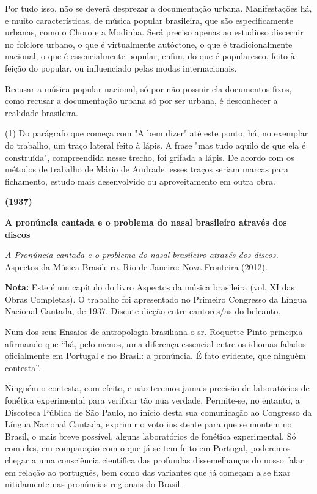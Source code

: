 Por tudo isso, não se deverá desprezar a documentação urbana.
Manifestações há, e muito características, de música popular brasileira,
que são especificamente urbanas, como o Choro e a Modinha. Será preciso
apenas ao estudioso discernir no folclore urbano, o que é virtualmente
autóctone, o que é tradicionalmente nacional, o que é essencialmente
popular, enfim, do que é popularesco, feito à feição do popular, ou
influenciado pelas modas internacionais.

Recusar a música popular nacional, só por não possuir ela documentos
fixos, como recusar a documentação urbana só por ser urbana, é
desconhecer a realidade brasileira.

(1) Do parágrafo que começa com "A bem dizer" até este ponto, há, no
exemplar do trabalho, um traço lateral feito à lápis. A frase "mas tudo
aquilo de que ela é construída", compreendida nesse trecho, foi grifada
a lápis. De acordo com os métodos de trabalho de Mário de Andrade, esses
traços seriam marcas para fichamento, estudo mais desenvolvido ou
aproveitamento em outra obra.

\textbf{(1937) }

\textbf{A pronúncia cantada e o problema do nasal brasileiro através dos
discos}

\emph{A Pronúncia cantada e o problema do nasal brasileiro através dos
discos.} Aspectos da Música Brasileiro. Rio de Janeiro: Nova Fronteira
(2012).

\textbf{Nota:} Este é um capítulo do livro Aspectos da música brasileira
(vol. XI das Obras Completas). O trabalho foi apresentado no Primeiro
Congresso da Língua Nacional Cantada, de 1937. Discute dicção entre
cantores/as do belcanto.

Num dos seus Ensaios de antropologia brasiliana o sr. Roquette-Pinto
principia afirmando que ``há, pelo menos, uma diferença essencial entre
os idiomas falados oficialmente em Portugal e no Brasil: a pronúncia. É
fato evidente, que ninguém contesta''.

Ninguém o contesta, com efeito, e não teremos jamais precisão de
laboratórios de fonética experimental para verificar tão nua verdade.
Permite-se, no entanto, a Discoteca Pública de São Paulo, no início
desta sua comunicação ao Congresso da Língua Nacional Cantada, exprimir
o voto insistente para que se montem no Brasil, o mais breve possível,
alguns laboratórios de fonética experimental. Só com eles, em comparação
com o que já se tem feito em Portugal, poderemos chegar a uma
consciência científica das profundas dissemelhanças do nosso falar em
relação ao português, bem como das variantes que já começam a se fixar
nitidamente nas pronúncias regionais do Brasil.

